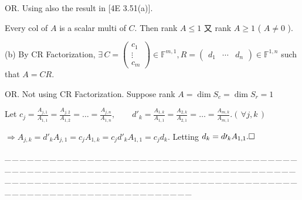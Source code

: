 \documentclass[a4paper, 11pt, UTF8]{article}
\def\Fbb{{\mathbb{F}}}
\def\apostrophe{\prime}
\def\Ha{\quad\hspace{8pt}}
\def\Hb{\quad\hspace{8.7pt}}
\def\Or{\large O{\footnotesize R.} }
\def\ProblemEnding{{\tiny \_\,\_\,\_\,\_\,\_\,\_\,\_\,\_\,\_\,\_\,\_\,\_\,\_\,\_\,\_\,\_\,\_\,\_\,\_\,\_\,\_\,\_\,\_\,\_\,\_\,\_\,\_\,\_\,\_\,\_\,\_\,\_\,\_\,\_\,\_\,\_\,\_\,\_\,\_\,\_\,\_\,\_\,\_\,\_\,\_\,\_\,\_\,\_\,\_\,\_\,\_\,\_\,\_\,\_\,\_\,\_\,\_\,\_\,\_\,\_\,\_\,\_\,\_\,\_\,\_\,\_\,\_\,\_\,\_\,\_\,\_\_\,\_\,\_\,\_\,\_\,\_\,\_\,\_\,\_\,\_\,\_\,\_\,\_\,\_\,\_\,\_\,\_\,\_\,\_\,\_\,\_\,\_\,\_\,\_\,\_\,\_\,\_\,\_\,\_\,\_\,\_\,\_\,\_\,\_\,\_\,\_\,\_\,\_\,\_\,\_\,\_\,\_\,\_\,\_\,\_\,\_\,\_\,\_\,\_\,\_\,\_\,\_\,\_\,\_\,\_\,\_\,\_\,\_\,\_\,\_\,\_\,\_\,\_\,\_\,\_\,\_\,\_\,\_\,\_\,\_\,\_}}
\begin{document}
\begin{large}
\Or {\Large\vspace{6pt}Using also the result in [4E 3.51(a)].}\par\quad\Ha
{\Large\vspace{6pt}Every col of $A$ is a scalar multi of $C.$ Then rank $A\leq 1$ 又 rank $A\geq 1$ ( $A\neq 0$ ).}\vspace{6pt}\par\quad
(b) By CR Factorization, $\exists\,C=\begin{pmatrix}c_1 \\ \vdots \\ c_m \end{pmatrix}\in\Fbb^{m,1},R=\begin{pmatrix} d_1 & \cdots & d_n\end{pmatrix}\in\Fbb^{1,n}$ such that $A=CR.$\vspace{4pt}\par\quad\Hb
\Or Not using CR Factorization. Suppose rank $A=\dim S_c=\dim S_r=1$ \par\quad\Hb
{\Large\vspace{6pt}Let $c_j=\displaystyle\frac{A_{j,1}}{A_{1,1}}=\frac{A_{j,2}}{A_{1,2}}=\dots=\frac{A_{j,n}}{A_{1,n}},\qquad d\apostrophe_k=\frac{A_{1,k}}{A_{1,1}}=\frac{A_{2,k}}{A_{2,1}}=\dots=\frac{A_{m,k}}{A_{m,1}}$.\quad$(\,\forall j,k\,)$}\par\vspace{6pt}\quad\Hb
{\Large\vspace{6pt}$\Rightarrow A_{j,k}=d\apostrophe_k A_{j,1}=c_j A_{1,k}=c_j d\apostrophe_k A_{1,1}=c_j d_k.$ Letting $d_k=d\apostrophe_k A_{1,1}.\hfill\square$}\par
\ProblemEnding\vspace{10pt}\par


\end{large}
\end{document}
